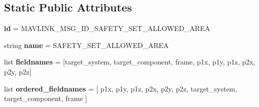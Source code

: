 \subsection*{Static Public Attributes}
\begin{DoxyCompactItemize}
\item 
\mbox{\label{classpymavlink_1_1dialects_1_1v10_1_1MAVLink__safety__set__allowed__area__message_a4f6da7ee72fd822b6d5ec8f839c492aa}} 
{\bfseries id} = M\+A\+V\+L\+I\+N\+K\+\_\+\+M\+S\+G\+\_\+\+I\+D\+\_\+\+S\+A\+F\+E\+T\+Y\+\_\+\+S\+E\+T\+\_\+\+A\+L\+L\+O\+W\+E\+D\+\_\+\+A\+R\+EA
\item 
\mbox{\label{classpymavlink_1_1dialects_1_1v10_1_1MAVLink__safety__set__allowed__area__message_ad6cdb046f59dc7409da9917d3aeaec7d}} 
string {\bfseries name} = \textquotesingle{}S\+A\+F\+E\+T\+Y\+\_\+\+S\+E\+T\+\_\+\+A\+L\+L\+O\+W\+E\+D\+\_\+\+A\+R\+EA\textquotesingle{}
\item 
\mbox{\label{classpymavlink_1_1dialects_1_1v10_1_1MAVLink__safety__set__allowed__area__message_ae1ff9979524b1dd24fef787ab2e94686}} 
list {\bfseries fieldnames} = \mbox{[}\textquotesingle{}target\+\_\+system\textquotesingle{}, \textquotesingle{}target\+\_\+component\textquotesingle{}, \textquotesingle{}frame\textquotesingle{}, \textquotesingle{}p1x\textquotesingle{}, \textquotesingle{}p1y\textquotesingle{}, \textquotesingle{}p1z\textquotesingle{}, \textquotesingle{}p2x\textquotesingle{}, \textquotesingle{}p2y\textquotesingle{}, \textquotesingle{}p2z\textquotesingle{}\mbox{]}
\item 
\mbox{\label{classpymavlink_1_1dialects_1_1v10_1_1MAVLink__safety__set__allowed__area__message_ab0bd3c74e4f5f0051e1ce52d80ef2af9}} 
list {\bfseries ordered\+\_\+fieldnames} = \mbox{[} \textquotesingle{}p1x\textquotesingle{}, \textquotesingle{}p1y\textquotesingle{}, \textquotesingle{}p1z\textquotesingle{}, \textquotesingle{}p2x\textquotesingle{}, \textquotesingle{}p2y\textquotesingle{}, \textquotesingle{}p2z\textquotesingle{}, \textquotesingle{}target\+\_\+system\textquotesingle{}, \textquotesingle{}target\+\_\+component\textquotesingle{}, \textquotesingle{}frame\textquotesingle{} \mbox{]}

\end{DoxyCompactItemize}
